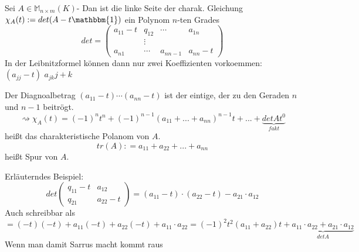 \documentclass[9pt]{article} %
\begin{document}
  \begin{defi}
  Sei $A \in \mathbb{M}_{n\times m}(K)$- Dan ist die linke Seite der charak. Gleichung 
  $\chi_A (t) : = det (A - t \mathbbm{1})$ ein Polynom $n$-ten Grades \[
  det = \begin{pmatrix}
  a_{11}- t & q_{12} & \cdots & a_{1n} \\
  & \vdots \\
  a_{n1} & \cdots & a_{nn-1} & a_{nn}-t 
  \end{pmatrix}
  \]
  In der Leibnitzformel können dann nur zwei Koeffizienten vorkoemmen: $(a_{jj}-t)$ $a_{jk} j+k$ 
 
 Der Diagnoalbetrag $(a_{11} -t) \cdots (a_{nn}-t)$ ist der eintige, der zu den Geraden $n$ und $n-1$ beitrögt.  \\
 \[
 \rightsquigarrow
 \chi_A(t) = (-1)^n t^n + (-1)^{n-1} (a_{11} + ... + a_{nn})^{n-1}t + ... + \underbrace{det A t^0 }_{fakt}\]
 heißt das charakteristische Polanom von $A$. 
 \[
 tr(A) : = a_{11} + a_{22} + ... + a_{nn}
 \] heißt Spur von $A$. 
  \end{defi}
Erläuterndes Beispiel: 
  \[
  det \begin{pmatrix}
  q_{11} -t & a_{12} \\ q_{21} & a_{22} - t 
  \end{pmatrix} = (a_{11}-t) \cdot (a_{22} -t) - a_{21}\cdot a_{12}
  \]
  Auch schreibbar als  
  \[
  = (-t)(-t) + a_{11}(-t) + a_{22}(-t) + a_{11} \cdot a_{22} = (-1)^2 t^2 (a_{11} + a_{22}) t + \underbrace{a_{11}\cdot a_{22} + a_{21} \cdot a_{12}}_{det A}
  \]
 Wenn man damit Sarrus macht kommt raus 
 
\end{document}
